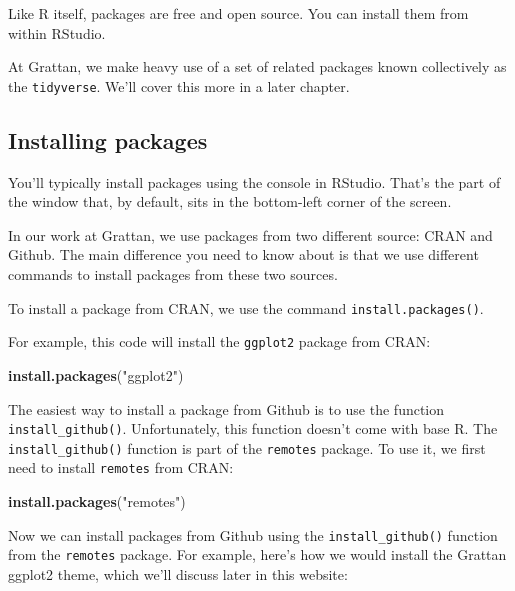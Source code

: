 \documentclass[]{book}
\newenvironment{Shaded}{\begin{snugshade}}{\end{snugshade}}
\newcommand{\KeywordTok}[1]{\textcolor[rgb]{0.13,0.29,0.53}{\textbf{#1}}}
\newcommand{\NormalTok}[1]{#1}
\newcommand{\StringTok}[1]{\textcolor[rgb]{0.31,0.60,0.02}{#1}}
\begin{document}
Like R itself, packages are free and open source. You can install them from within RStudio.

At Grattan, we make heavy use of a set of related packages known collectively as the \texttt{tidyverse}. We'll cover this more in a later chapter.

\hypertarget{installing-packages}{%
\subsection{Installing packages}\label{installing-packages}}

You'll typically install packages using the console in RStudio. That's the part of the window that, by default, sits in the bottom-left corner of the screen.

In our work at Grattan, we use packages from two different source: CRAN and Github. The main difference you need to know about is that we use different commands to install packages from these two sources.

To install a package from CRAN, we use the command \texttt{install.packages()}.

For example, this code will install the \texttt{ggplot2} package from CRAN:

\begin{Shaded}
\begin{Highlighting}[]
\KeywordTok{install.packages}\NormalTok{(}\StringTok{"ggplot2"}\NormalTok{)}
\end{Highlighting}
\end{Shaded}

The easiest way to install a package from Github is to use the function \texttt{install\_github()}. Unfortunately, this function doesn't come with base R. The \texttt{install\_github()} function is part of the \texttt{remotes} package. To use it, we first need to install \texttt{remotes} from CRAN:

\begin{Shaded}
\begin{Highlighting}[]
\KeywordTok{install.packages}\NormalTok{(}\StringTok{"remotes"}\NormalTok{)}
\end{Highlighting}
\end{Shaded}

Now we can install packages from Github using the \texttt{install\_github()} function from the \texttt{remotes} package. For example, here's how we would install the Grattan ggplot2 theme, which we'll discuss later in this website:
\end{document}

